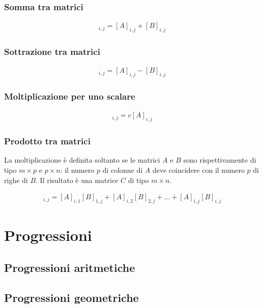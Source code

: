\documentclass[a4paper]{article}
\begin{document}
	 \subsubsection{Somma tra matrici}
	 \begin{align*}
	 	[A+B]_{i,j} = [A]_{i,j} + [B]_{i,j}
	 \end{align*}
	 
	 \subsubsection{Sottrazione tra matrici}
	 \begin{align*}
	 [A-B]_{i,j} = [A]_{i,j} - [B]_{i,j}
	 \end{align*}
	 
	\subsubsection{Moltiplicazione per uno scalare}
	\begin{align*}
	[cA]_{i,j} = c[A]_{i,j}
	\end{align*}
	
	\subsubsection{Prodotto tra matrici}
	La moltiplicazione è definita soltanto se le matrici $A$ e $B$ sono rispettivamente di tipo $m \times p$ e $p\times n$: il numero $p$ di colonne di $A$ deve coincidere con il numero $p$ di righe di $B$. Il risultato è una matrice $C$ di tipo $m\times n$.
	
	\begin{align*}
		[C]_{i,j} = [A]_{i,1}[B]_{1,j} + [A]_{i,2}[B]_{2,j} + ... + [A]_{i,j}[B]_{i,j}
	\end{align*}
	
	
	\newpage
	\section{Progressioni}
	
	\subsection{Progressioni aritmetiche}
	
	
	\subsection{Progressioni geometriche}
	
\end{document}
